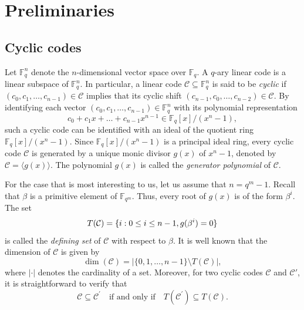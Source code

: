 \documentclass[journal,onecolumn]{IEEEtran}
\newcommand{\C}{\mathcal{C}}
\begin{document}
\section{Preliminaries}\label{preliminaries}

\subsection{Cyclic codes}
Let  $\mathbb{F}_q^n$ denote the $n$-dimensional vector space over $\mathbb{F}_q$.
A $q$-ary linear code is a linear subspace of $\mathbb{F}_q^n$. In particular, a linear code $\mathcal{C} \subseteq \mathbb{F}_q^n$ is said to be \textit{cyclic} if $(c_0, c_1, \dots, c_{n-1}) \in \mathcal{C}$ implies that its cyclic shift $(c_{n-1}, c_0, \dots, c_{n-2}) \in \mathcal{C}$. By identifying each vector $(c_0, c_1, \dots, c_{n-1}) \in \mathbb{F}_q^n$ with its polynomial representation
   \begin{equation*}
   c_0 + c_1x + \dots + c_{n-1}x^{n-1} \in \mathbb{F}_q[x]/(x^n - 1),
   \end{equation*}
such a cyclic code can be identified with an ideal of the quotient ring $\mathbb{F}_q[x]/(x^n - 1)$. Since $\mathbb{F}_q[x]/(x^n - 1)$ is a principal ideal ring, every cyclic code $\mathcal{C}$ is generated by a unique monic divisor $g(x)$ of $x^n-1$, denoted by $\mathcal{C} = \langle g(x) \rangle$. The polynomial $g(x)$ is called the \textit{generator polynomial} of $\mathcal{C}$. 

For the case that is most interesting to us, let us assume that $n=q^m-1$. Recall that $\beta$ is a primitive element of $\mathbb{F}_{q^m}$. Thus, every root of $g(x)$ is of the form $\beta^i$. The set 
\begin{equation}\notag
 T(\mathcal{C})=  \{i: 0\leq i\leq n-1, g(\beta^i)=0\} 
\end{equation}
is called the \textit{defining set} of $\mathcal{C}$ with respect to $\beta$. 
It is well known that the dimension of $\C$ is given by
\begin{equation}\label{dim}
\dim(\C)
=
\left|\{0,1,\ldots,n-1\}\setminus T(\C)\right|,
\end{equation}
where $|\cdot|$ denotes the cardinality of a set.
Moreover, for two cyclic codes $\C$ and $\C'$, it is
straightforward to verify that
\begin{equation}\label{pre2}
\mathcal{C}\subseteq \mathcal{C}^{\prime} \quad \text{if and only if} \quad T(\mathcal{C}^{\prime}) \subseteq T(\mathcal{C}).
\end{equation}
\end{document}
